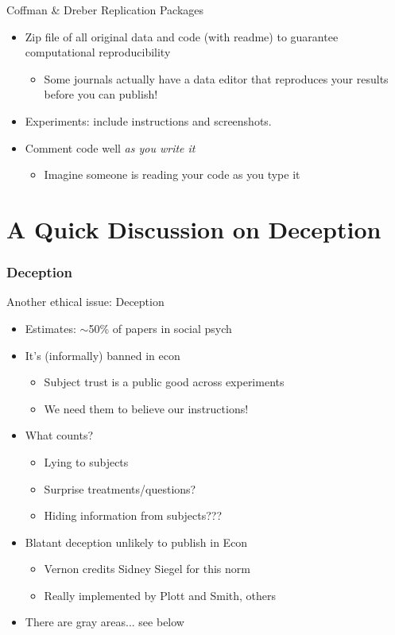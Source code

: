 \begin{frame}{Coffman \& Dreber}
    Replication Packages
    \begin{itemize}
        \item Zip file of all original data and code (with readme) to guarantee computational reproducibility
        \begin{itemize}
            \item Some journals actually have a data editor that reproduces your results before you can publish!
        \end{itemize}
        \item Experiments: include instructions and screenshots.
        \item Comment code well \textit{as you write it}
        \begin{itemize}
            \item Imagine someone is reading your code as you type it
        \end{itemize}
        
    \end{itemize}
    
\end{frame}

\section{A Quick Discussion on Deception}

\begin{frame}
\frametitle{Deception}
Another ethical issue: Deception
\begin{itemize}
    \item Estimates: $\sim$50\% of papers in social psych
    \item It's (informally) banned in econ
    \begin{itemize}
        \item Subject trust is a public good across experiments
        \item We need them to believe our instructions!
    \end{itemize}
    \item What counts?
    \begin{itemize}
        \item Lying to subjects
        \item Surprise treatments/questions?
        \item Hiding information from subjects???
    \end{itemize}
    \item Blatant deception unlikely to publish in Econ
    \begin{itemize}
        \item Vernon credits Sidney Siegel for this norm
        \item Really implemented by Plott and Smith, others
    \end{itemize}
    \item There are gray areas... see below
\end{itemize}
\end{frame}

